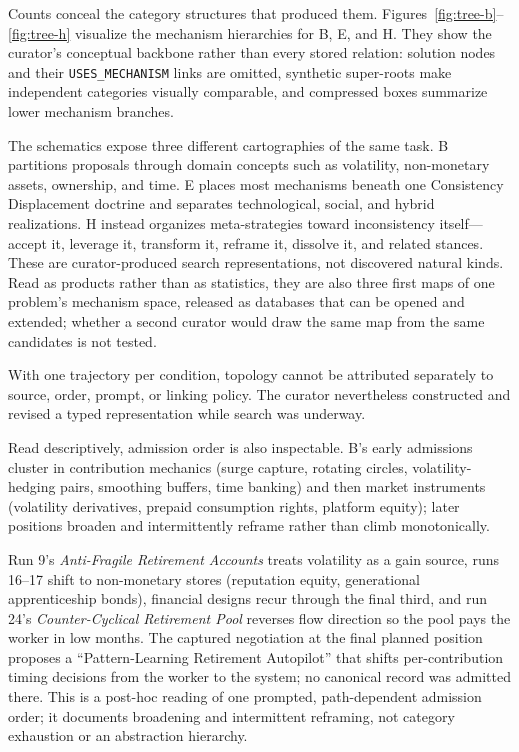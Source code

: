 \documentclass[11pt,a4paper]{article}
\begin{document}
Counts conceal the category structures that produced them. Figures~\ref{fig:tree-b}--\ref{fig:tree-h} visualize the mechanism hierarchies for B, E, and H. They show the curator's conceptual backbone rather than every stored relation: solution nodes and their \texttt{USES\_MECHANISM} links are omitted, synthetic super-roots make independent categories visually comparable, and compressed boxes summarize lower mechanism branches.





The schematics expose three different cartographies of the same task. B partitions proposals through domain concepts such as volatility, non-monetary assets, ownership, and time. E places most mechanisms beneath one Consistency Displacement doctrine and separates technological, social, and hybrid realizations. H instead organizes meta-strategies toward inconsistency itself---accept it, leverage it, transform it, reframe it, dissolve it, and related stances. These are curator-produced search representations, not discovered natural kinds. Read as products rather than as statistics, they are also three first maps of one problem's mechanism space, released as databases that can be opened and extended; whether a second curator would draw the same map from the same candidates is not tested.

With one trajectory per condition, topology cannot be attributed separately to source, order, prompt, or linking policy. The curator nevertheless constructed and revised a typed representation while search was underway.

Read descriptively, admission order is also inspectable. B's early admissions cluster in contribution mechanics (surge capture, rotating circles, volatility-hedging pairs, smoothing buffers, time banking) and then market instruments (volatility derivatives, prepaid consumption rights, platform equity); later positions broaden and intermittently reframe rather than climb monotonically.

Run 9's \emph{Anti-Fragile Retirement Accounts} treats volatility as a gain source, runs 16--17 shift to non-monetary stores (reputation equity, generational apprenticeship bonds), financial designs recur through the final third, and run 24's \emph{Counter-Cyclical Retirement Pool} reverses flow direction so the pool pays the worker in low months. The captured negotiation at the final planned position proposes a ``Pattern-Learning Retirement Autopilot'' that shifts per-contribution timing decisions from the worker to the system; no canonical record was admitted there. This is a post-hoc reading of one prompted, path-dependent admission order; it documents broadening and intermittent reframing, not category exhaustion or an abstraction hierarchy.
\end{document}
